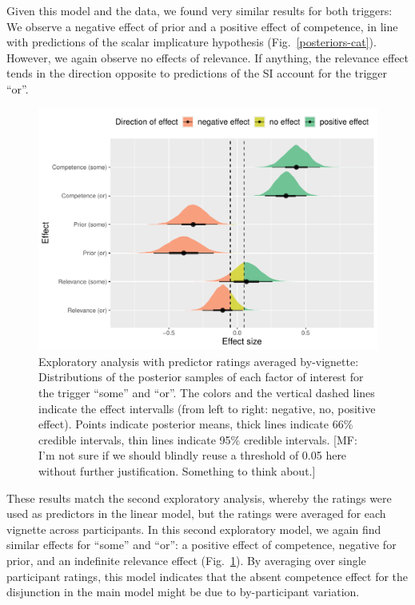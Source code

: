 \documentclass{sp}
\newcommand{\mf}[1]{\textcolor{BurntOrange}{[MF: #1]}}
\begin{document}
Given this model and the data, we found very similar results for both triggers: We observe a negative effect of prior and a positive effect of competence, in line with predictions of the scalar implicature hypothesis (Fig.~\ref{posteriors-cat}). However, we again observe no effects of relevance. If anything, the relevance effect tends in the direction opposite to predictions of the SI account for the trigger ``or''. 

\begin{figure}[h]
	\begin{center}
		\includegraphics[width=1\linewidth]{images/posterior-effects-means.pdf}
	\end{center}
	\vspace{-0.3cm}
	\caption{Exploratory analysis with predictor ratings averaged by-vignette: Distributions of the posterior samples of each factor of interest for the trigger ``some'' and ``or''. The colors and the vertical dashed lines indicate the effect intervalls (from left to right: negative, no, positive effect). Points indicate posterior means, thick lines indicate 66\% credible intervals, thin lines indicate 95\% credible intervals. \mf{I'm not sure if we should blindly reuse a threshold of 0.05 here without further justification. Something to think about.}}
	\label{posteriors-mean}
\end{figure}

These results match the second exploratory analysis, whereby the ratings were used as predictors in the linear model, but the ratings were averaged for each vignette across participants. In this second  exploratory model, we again find similar effects for ``some'' and ``or'': a positive effect of competence, negative for prior, and an indefinite relevance effect (Fig.~\ref{posteriors-mean}). By averaging over single participant ratings, this model indicates that the absent competence effect for the disjunction in the main model might be due to by-participant variation.
\end{document}
